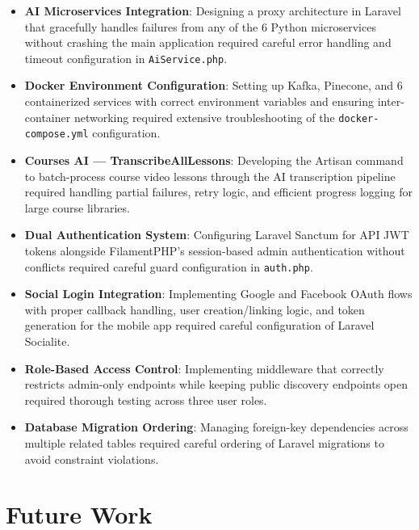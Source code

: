 \begin{itemize}
  \item \textbf{AI Microservices Integration}: Designing a proxy architecture
        in Laravel that gracefully handles failures from any of the 6 Python
        microservices without crashing the main application required careful
        error handling and timeout configuration in \texttt{AiService.php}.

  \item \textbf{Docker Environment Configuration}: Setting up Kafka, Pinecone,
        and 6 containerized services with correct environment variables and
        ensuring inter-container networking required extensive troubleshooting
        of the \texttt{docker-compose.yml} configuration.

  \item \textbf{Courses AI --- TranscribeAllLessons}: Developing the Artisan
        command to batch-process course video lessons through the AI
        transcription pipeline required handling partial failures, retry logic,
        and efficient progress logging for large course libraries.

  \item \textbf{Dual Authentication System}: Configuring Laravel Sanctum for
        API JWT tokens alongside FilamentPHP's session-based admin
        authentication without conflicts required careful guard configuration
        in \texttt{auth.php}.

  \item \textbf{Social Login Integration}: Implementing Google and Facebook
        OAuth flows with proper callback handling, user creation/linking logic,
        and token generation for the mobile app required careful configuration
        of Laravel Socialite.

  \item \textbf{Role-Based Access Control}: Implementing middleware that
        correctly restricts admin-only endpoints while keeping public discovery
        endpoints open required thorough testing across three user roles.

  \item \textbf{Database Migration Ordering}: Managing foreign-key dependencies
        across multiple related tables required careful ordering of Laravel
        migrations to avoid constraint violations.
\end{itemize}

\section{Future Work}
\label{sec:ch4future}

